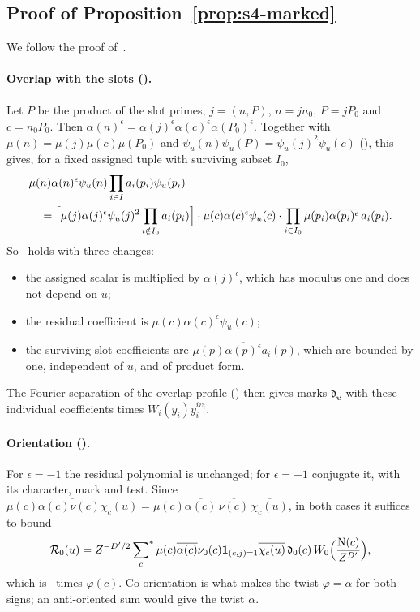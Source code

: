 \documentclass[11pt]{article}
\numberwithin{equation}{section}
\newcommand{\N}{\mathrm N}
\newcommand{\ind}{\mathbf1}
\newcommand{\ssum}{\sideset{}{^*}\sum}
\begin{document}
\subsection{Proof of Proposition~\ref{prop:s4-marked}}\label{sec:s4-marked-proof}
We follow the proof of~\cite[Lemma~17.1]{OAI78}.

\paragraph{Overlap with the slots (\cite[proof of Lemma~17.1]{OAI78}).} Let $P$ be the product of the slot primes, $j=(n,P)$,
$n=jn_0$, $P=jP_0$ and $c=n_0P_0$. Then
$\alpha(n)^{\epsilon}=\alpha(j)^{\epsilon}\alpha(c)^{\epsilon}\overline{\alpha(P_0)^{\epsilon}}$. Together with
$\mu(n)=\mu(j)\mu(c)\mu(P_0)$ and $\psi_u(n)\psi_u(P)=\psi_u(j)^2\psi_u(c)$ (\cite[proof of Lemma~17.1]{OAI78}), this gives, for a fixed
assigned tuple with surviving subset $I_0$,
\begin{equation}\label{eq:s4-overlap}
\begin{split}
 &\mu(n)\alpha(n)^{\epsilon}\psi_u(n)\prod_{i\in I}a_i(p_i)\psi_u(p_i)\\
 &\quad=\Bigl[\mu(j)\alpha(j)^{\epsilon}\psi_u(j)^2\prod_{i\notin I_0}a_i(p_i)\Bigr]\cdot
 \mu(c)\alpha(c)^{\epsilon}\psi_u(c)\cdot\prod_{i\in I_0}\mu(p_i)\overline{\alpha(p_i)^{\epsilon}}\,a_i(p_i).
\end{split}
\end{equation}
So~\cite[eq.~(17.67)]{OAI78} holds with three changes:
\begin{itemize}
\item the assigned scalar is multiplied by $\alpha(j)^{\epsilon}$, which has modulus one and does not depend on $u$;
\item the residual coefficient is $\mu(c)\alpha(c)^{\epsilon}\psi_u(c)$;
\item the surviving slot coefficients are $\mu(p)\overline{\alpha(p)^{\epsilon}}a_i(p)$, which are bounded by one,
 independent of $u$, and of product form.
\end{itemize}
The Fourier separation of the overlap profile (\cite[proof of Lemma~17.1]{OAI78}) then gives marks
$\mathfrak d_{\boldsymbol\upsilon}$ with these individual coefficients times $W_i(y_i)y_i^{i\upsilon_i}$.

\paragraph{Orientation (\cite[proof of Lemma~17.1]{OAI78}).} For $\epsilon=-1$ the residual polynomial is unchanged; for $\epsilon=+1$
conjugate it, with its character, mark and test. Since
$\overline{\mu(c)\alpha(c)\nu(c)\chi_c(u)}=\mu(c)\overline{\alpha(c)}\,\overline{\nu(c)}\,\overline{\chi_c(u)}$, in
both cases it suffices to bound
\begin{equation}\label{eq:s4-R0}
 \mathcal R_0(u)=Z^{-D'/2}\ssum_c\mu(c)\overline{\alpha(c)}\nu_0(c)\ind_{(c,j)=1}\overline{\chi_c(u)}\,
 \mathfrak d_0(c)\,W_0\Bigl(\frac{\N(c)}{Z^{D'}}\Bigr),
\end{equation}
which is~\cite[eq.~(17.68)]{OAI78} times $\varphi(c)$. Co-orientation is what makes
the twist $\varphi=\overline\alpha$ for both signs; an anti-oriented sum would give the twist $\alpha$.
\end{document}
